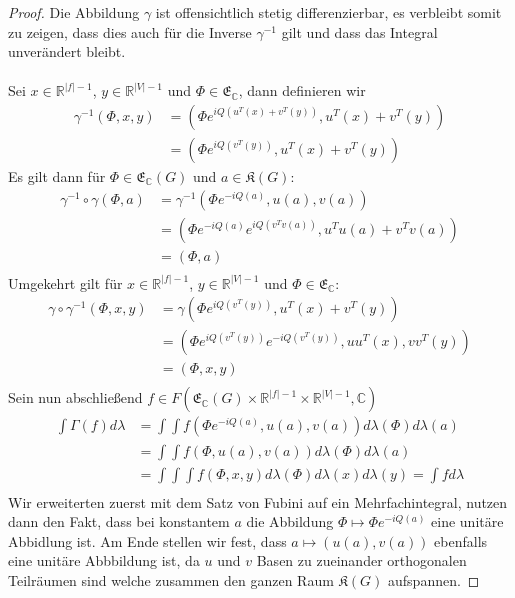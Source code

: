 \documentclass[11pt,a4paper,leqno]{report}
\numberwithin{equation}{chapter}
\begin{document}
\begin{proof}
	Die Abbildung $\gamma$ ist offensichtlich stetig differenzierbar, es verbleibt somit zu zeigen, dass dies auch f\"ur die Inverse $\gamma^{-1}$ gilt und dass das Integral unverändert bleibt.\\
	\\
	Sei $x\in \mathbb{R}^{|f|-1}$, $y\in \mathbb{R}^{|V|-1}$ und $\Phi\in\mathfrak{E}_\mathbb{C}$, dann definieren wir
	\begin{align*}
		\gamma^{-1}(\Phi, x, y) &= (\Phi e^{iQ(u^T(x)+v^T(y))},u^T(x)+v^T(y))\\
		&= (\Phi e^{iQ(v^T(y))},u^T(x)+v^T(y))
	\end{align*}
	Es gilt dann f\"ur $\Phi\in\mathfrak{E}_\mathbb{C}(G)$ und $a\in\mathfrak{K}(G)$:
	\begin{align*}
		\gamma^{-1}\circ\gamma(\Phi, a) &= \gamma^{-1}(\Phi e^{-iQ(a)}, u(a), v(a))\\
		&= (\Phi e^{-iQ(a)}e^{iQ(v^Tv(a))}, u^Tu(a) + v^Tv(a))\\
		&= (\Phi , a)\\
	\end{align*}
	Umgekehrt gilt f\"ur $x\in \mathbb{R}^{|f|-1}$, $y\in \mathbb{R}^{|V|-1}$ und $\Phi\in\mathfrak{E}_\mathbb{C}$:
	\begin{align*}
		\gamma\circ\gamma^{-1}(\Phi, x, y)&= \gamma(\Phi e^{iQ(v^T(y))},u^T(x)+v^T(y))\\
		&= (\Phi e^{iQ(v^T(y))}e^{-iQ(v^T(y))},uu^T(x),vv^T(y))\\
		&= (\Phi,x,y)\\
	\end{align*}
Sein nun abschlie\ss{}end $f\in F(\mathfrak{E}_\mathbb{C}(G)\times\mathbb{R}^{|f|-1}\times\mathbb{R}^{|V|-1}, \mathbb{C})$
\begin{align*}
	\int \Gamma(f) d\lambda &= \int\int f(\Phi e^{-iQ(a)}, u(a), v(a))d\lambda(\Phi)d\lambda(a)\\
	&= \int\int f(\Phi, u(a), v(a))d\lambda(\Phi)d\lambda(a)\\
	&= \int\int\int f(\Phi, x, y)d\lambda(\Phi)d\lambda(x)d\lambda(y)=\int f d\lambda\\
\end{align*}
Wir erweiterten zuerst mit dem Satz von Fubini auf ein Mehrfachintegral, nutzen dann den Fakt, dass bei konstantem $a$ die Abbildung $\Phi \mapsto \Phi e^{-iQ(a)}$ eine unit\"are Abbidlung ist. Am Ende stellen wir fest, dass $a\mapsto (u(a), v(a))$ ebenfalls eine unit\"are Abbbildung ist, da $u$ und $v$ Basen zu zueinander orthogonalen Teilr\"aumen sind welche zusammen den ganzen Raum $\mathfrak{K}(G)$ aufspannen.
\end{proof}
\end{document}
